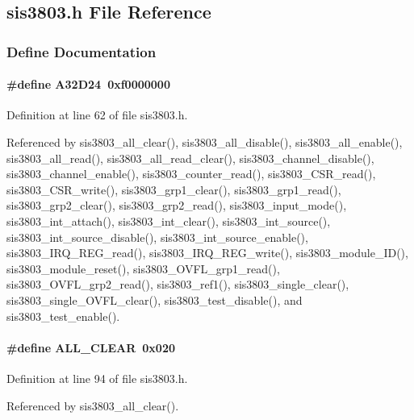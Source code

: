 \subsection{sis3803.h File Reference}
\label{sis3803_8h}


\subsubsection{Define Documentation}
\paragraph[{A32D24}]{\setlength{\rightskip}{0pt plus 5cm}\#define A32D24~0xf0000000}\hfill\label{sis3803_8h_ad6ad0f05927f9b9e0ba24b63d6acad5d}


Definition at line 62 of file sis3803.h.

Referenced by sis3803\_\-all\_\-clear(), sis3803\_\-all\_\-disable(), sis3803\_\-all\_\-enable(), sis3803\_\-all\_\-read(), sis3803\_\-all\_\-read\_\-clear(), sis3803\_\-channel\_\-disable(), sis3803\_\-channel\_\-enable(), sis3803\_\-counter\_\-read(), sis3803\_\-CSR\_\-read(), sis3803\_\-CSR\_\-write(), sis3803\_\-grp1\_\-clear(), sis3803\_\-grp1\_\-read(), sis3803\_\-grp2\_\-clear(), sis3803\_\-grp2\_\-read(), sis3803\_\-input\_\-mode(), sis3803\_\-int\_\-attach(), sis3803\_\-int\_\-clear(), sis3803\_\-int\_\-source(), sis3803\_\-int\_\-source\_\-disable(), sis3803\_\-int\_\-source\_\-enable(), sis3803\_\-IRQ\_\-REG\_\-read(), sis3803\_\-IRQ\_\-REG\_\-write(), sis3803\_\-module\_\-ID(), sis3803\_\-module\_\-reset(), sis3803\_\-OVFL\_\-grp1\_\-read(), sis3803\_\-OVFL\_\-grp2\_\-read(), sis3803\_\-ref1(), sis3803\_\-single\_\-clear(), sis3803\_\-single\_\-OVFL\_\-clear(), sis3803\_\-test\_\-disable(), and sis3803\_\-test\_\-enable().
\paragraph[{ALL\_\-CLEAR}]{\setlength{\rightskip}{0pt plus 5cm}\#define ALL\_\-CLEAR~0x020}\hfill\label{sis3803_8h_ac98deafc05f78857417ee0928eb8b786}


Definition at line 94 of file sis3803.h.

Referenced by sis3803\_\-all\_\-clear().
